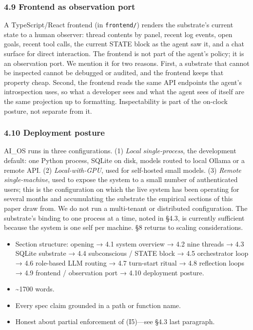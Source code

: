 \documentclass[11pt,letterpaper]{article}
\begin{document}
\subsubsection*{4.9 Frontend as observation port}

A TypeScript/React frontend (in \texttt{frontend/}) renders the substrate's current state to a human observer: thread contents by panel, recent log events, open goals, recent tool calls, the current STATE block as the agent saw it, and a chat surface for direct interaction. The frontend is not part of the agent's policy; it is an observation port. We mention it for two reasons. First, a substrate that cannot be inspected cannot be debugged or audited, and the frontend keeps that property cheap. Second, the frontend reads the same API endpoints the agent's introspection uses, so what a developer sees and what the agent sees of itself are the same projection up to formatting. Inspectability is part of the on-clock posture, not separate from it.

\subsubsection*{4.10 Deployment posture}

AI\_OS runs in three configurations. (1) \emph{Local single-process}, the development default: one Python process, SQLite on disk, models routed to local Ollama or a remote API. (2) \emph{Local-with-GPU}, used for self-hosted small models. (3) \emph{Remote single-machine}, used to expose the system to a small number of authenticated users; this is the configuration on which the live system has been operating for several months and accumulating the substrate the empirical sections of this paper draw from. We do not run a multi-tenant or distributed configuration. The substrate's binding to one process at a time, noted in §4.3, is currently sufficient because the system is one self per machine. §8 returns to scaling considerations.

\begin{itemize}
  \item Section structure: opening → 4.1 system overview → 4.2 nine threads → 4.3 SQLite substrate → 4.4 subconscious / STATE block → 4.5 orchestrator loop → 4.6 role-based LLM routing → 4.7 turn-start ritual → 4.8 reflection loops → 4.9 frontend / observation port → 4.10 deployment posture.
  \item \textasciitilde{}1700 words.
  \item Every spec claim grounded in a path or function name.
  \item Honest about partial enforcement of (I5)---see §4.3 last paragraph.
\end{itemize}
\end{document}
